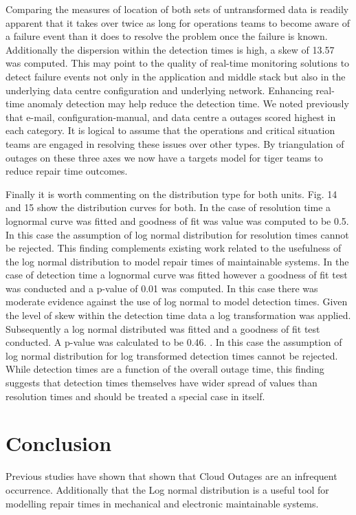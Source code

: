 \documentclass[conference]{IEEEtran}
\begin{document}
Comparing the measures of location of both sets of untransformed data is readily apparent that it takes over twice as long for operations teams to become aware of a failure event than it does to resolve the problem once the failure is known. Additionally the dispersion within the detection times is high, a skew of 13.57 was computed. This may point to the quality of real-time monitoring solutions to detect failure events not only in the application and middle stack but also in the underlying data centre configuration and underlying network. Enhancing real-time anomaly detection may help reduce the detection time. We noted previously that e-mail, configuration-manual, and data centre a outages scored highest in each category. It is logical to assume that the operations and critical situation teams are engaged in resolving these issues over other types. By triangulation of outages on these three axes we now have a targets model for tiger teams to reduce repair time outcomes. \par

Finally it is worth commenting on the distribution type for both units. Fig. 14 and 15 show the distribution curves for both.  In the case of resolution time a lognormal curve was fitted and goodness of fit was value was computed to be 0.5. In this case the assumption of log normal distribution for resolution times cannot be rejected. This finding complements existing work related to the usefulness of the log normal distribution to model repair times of maintainable systems. In the case of detection time a lognormal curve was fitted however a goodness of fit test was conducted and a p-value of 0.01 was computed. In this case there was moderate evidence against the use of log normal to model detection times. Given the level of skew within the detection time data a log transformation was applied. Subsequently a log normal distributed was fitted and a goodness of fit test conducted. A p-value was calculated to be 0.46. . In this case the assumption of log normal distribution for log transformed detection times cannot be rejected. While detection times are a function of the overall outage time, this finding suggests that detection times themselves have wider spread of values than resolution times and should be treated a special case in itself. \par



\vspace{-1mm}
\section{Conclusion}
Previous studies have shown that shown that Cloud Outages are an infrequent occurrence. Additionally that the Log normal distribution is a useful tool for modelling repair times in mechanical and electronic maintainable systems. \par
\end{document}
